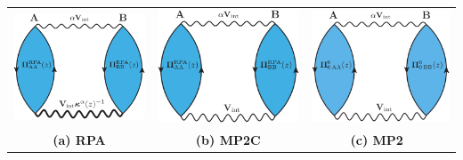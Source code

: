 \documentclass{standalone}
\begin{document}

\begin{tabular}{ccc}
    \includegraphics[scale=0.14]{rpa.eps} 
  & \includegraphics[scale=0.14]{mp2c.eps}
  & \includegraphics[scale=0.14]{mp2.eps} \\
  \huge\bf{(a)} RPA & \huge\bf{(b)} MP2C & \huge\bf{(c)} MP2\
\end{tabular}
\end{document}
